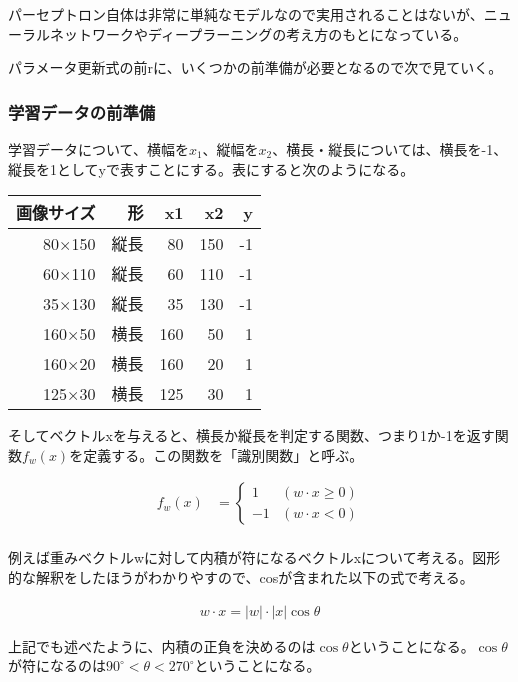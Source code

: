 \documentclass{jsarticle}
\begin{document}
パーセプトロン自体は非常に単純なモデルなので実用されることはないが、ニューラルネットワークやディープラーニングの考え方のもとになっている。

パラメータ更新式の前rに、いくつかの前準備が必要となるので次で見ていく。

\subsubsection{学習データの前準備}
学習データについて、横幅を$x_1$、縦幅を$x_2$、横長・縦長については、横長を-1、縦長を1としてyで表すことにする。表にすると次のようになる。

\begin{table}[htb]
  \begin{tabular}{|r|r|r|r|r|} \hline
    画像サイズ & 形 & x1 & x2 & y \\ \hline
    80×150 & 縦長 & 80 & 150 & -1 \\ \hline
    60×110 & 縦長 & 60 & 110 & -1 \\ \hline
    35×130 & 縦長 & 35 & 130 & -1 \\ \hline
    160×50 & 横長 & 160 & 50 & 1 \\ \hline
    160×20 & 横長 & 160 & 20 & 1 \\ \hline
    125×30 & 横長 & 125 & 30 & 1 \\ \hline
  \end{tabular}
\end{table}

そしてベクトルxを与えると、横長か縦長を判定する関数、つまり1か-1を返す関数$f_w(x)$を定義する。この関数を「識別関数」と呼ぶ。

\begin{align}
  f_w(x) &= \left \{
    \begin{array}{cc}
      1 & (w \cdot x \geq 0) \\
      -1 & (w \cdot x < 0)
    \end{array}
  \right. \\
\end{align}

例えば重みベクトルwに対して内積が符になるベクトルxについて考える。図形的な解釈をしたほうがわかりやすので、cosが含まれた以下の式で考える。

\begin{align}
	w \cdot x = |w| \cdot |x| \cos \theta
\end{align}

上記でも述べたように、内積の正負を決めるのは$\cos \theta$ということになる。$\cos \theta$が符になるのは$90^\circ < \theta < 270^\circ$ということになる。
\end{document}
